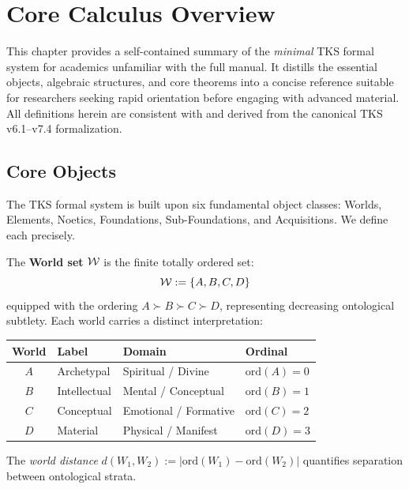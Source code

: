 
\chapter{Core Calculus Overview}
\label{ch:core-calculus}

\begin{tcolorbox}[colback=cyan!5!white,colframe=cyan!75!black,title=\textbf{Purpose}]
This chapter provides a self-contained summary of the \emph{minimal} TKS formal system
for academics unfamiliar with the full manual. It distills the essential objects,
algebraic structures, and core theorems into a concise reference suitable for
researchers seeking rapid orientation before engaging with advanced material.
All definitions herein are consistent with and derived from the canonical TKS v6.1--v7.4
formalization.
\end{tcolorbox}

\section{Core Objects}
\label{sec:core-objects}

The TKS formal system is built upon six fundamental object classes: Worlds, Elements,
Noetics, Foundations, Sub-Foundations, and Acquisitions. We define each precisely.

\begin{definition}[Worlds]
\label{def:core-worlds}
The \textbf{World set} $\mathcal{W}$ is the finite totally ordered set:
\[
    \mathcal{W} := \{A, B, C, D\}
\]
equipped with the ordering $A \succ B \succ C \succ D$, representing decreasing
ontological subtlety. Each world carries a distinct interpretation:
\begin{center}
\begin{tabular}{clll}
\toprule
\textbf{World} & \textbf{Label} & \textbf{Domain} & \textbf{Ordinal} \\
\midrule
$A$ & Archetypal & Spiritual / Divine & $\mathrm{ord}(A) = 0$ \\
$B$ & Intellectual & Mental / Conceptual & $\mathrm{ord}(B) = 1$ \\
$C$ & Conceptual & Emotional / Formative & $\mathrm{ord}(C) = 2$ \\
$D$ & Material & Physical / Manifest & $\mathrm{ord}(D) = 3$ \\
\bottomrule
\end{tabular}
\end{center}
The \emph{world distance} $d(W_1, W_2) := |\mathrm{ord}(W_1) - \mathrm{ord}(W_2)|$
quantifies separation between ontological strata.
\end{definition}

